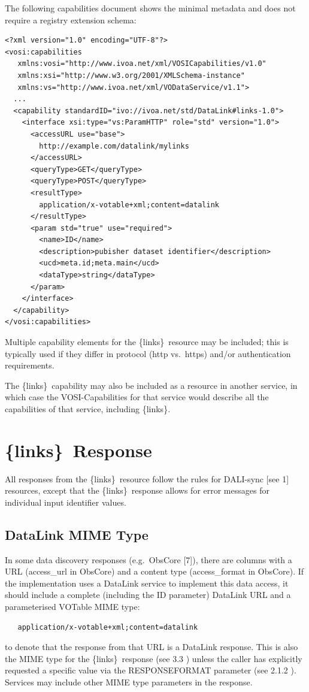 \documentclass[11pt,a4paper]{ivoa}
\newcommand{\blinks}{\{links\}}
\begin{document}
The following capabilities document shows the minimal metadata
and does not require a registry extension schema:
\begin{verbatim}
<?xml version="1.0" encoding="UTF-8"?>
<vosi:capabilities
   xmlns:vosi="http://www.ivoa.net/xml/VOSICapabilities/v1.0"
   xmlns:xsi="http://www.w3.org/2001/XMLSchema-instance"
   xmlns:vs="http://www.ivoa.net/xml/VODataService/v1.1">
  ...
  <capability standardID="ivo://ivoa.net/std/DataLink#links-1.0">
    <interface xsi:type="vs:ParamHTTP" role="std" version="1.0">
      <accessURL use="base">
        http://example.com/datalink/mylinks
      </accessURL>
      <queryType>GET</queryType>
      <queryType>POST</queryType>
      <resultType>
        application/x-votable+xml;content=datalink
      </resultType>
      <param std="true" use="required">
        <name>ID</name>
        <description>pubisher dataset identifier</description>
        <ucd>meta.id;meta.main</ucd>
        <dataType>string</dataType>
      </param>
    </interface>
  </capability>
</vosi:capabilities>
\end{verbatim}

Multiple capability elements for the \blinks\ resource may be included;
this is typically used if they differ in protocol (http vs.\ https)
and/or authentication requirements.

The \blinks\ capability may also be included as a resource in another
service, in which case the VOSI-Capabilities for that service would
describe all the capabilities of that service, including \blinks.


\section{\blinks\ Response}

All responses from the \blinks\ resource follow the rules for DALI-sync
[see 1] resources, except that the \blinks\ response allows for error
messages for individual input identifier values.


\subsection{DataLink MIME Type}

In some data discovery responses (e.g.\ ObsCore [7]), there are columns
with a URL (access\_url in ObsCore) and a content type (access\_format in
ObsCore). If the implementation uses a DataLink service to implement this
data access, it should include a complete (including the ID parameter)
DataLink URL and a parameterised VOTable MIME type:
\begin{verbatim}
   application/x-votable+xml;content=datalink
\end{verbatim}
to denote that the response from that URL is a DataLink response. This
is also the MIME type for the \blinks\ response (see 3.3 ) unless the
caller has explicitly requested a specific value via the RESPONSEFORMAT
parameter (see 2.1.2 ).
Services may include other MIME type parameters in the response.
\end{document}
